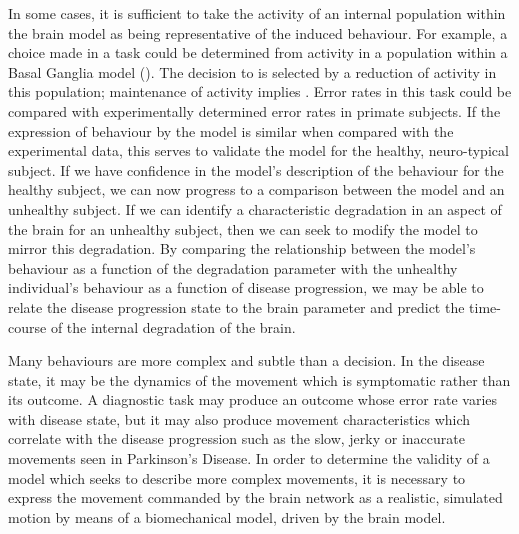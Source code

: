 \documentclass{frontiersSCNS}
\begin{document}
In some cases, it is sufficient to take the activity of an internal
population within the brain model as being representative of the
induced behaviour. For example, a choice made in a  task
could be determined from activity in a population within a Basal
Ganglia model
(). The decision
to  is selected by a reduction of activity in this population;
maintenance of activity implies . Error rates in this task
could be compared with experimentally determined error rates in
primate subjects.
If the expression of behaviour by the model is similar when compared
with the experimental data, this serves to validate the model for the
healthy, neuro-typical subject.
If we have confidence in the model's description of the behaviour for
the healthy subject, we can now progress to a comparison between the
model and an unhealthy subject. If we can identify a characteristic
degradation in an aspect of the brain for an unhealthy subject, then
we can seek to modify the model to mirror this degradation. By
comparing the relationship between the model's behaviour as a function
of the degradation parameter with the unhealthy individual's behaviour
as a function of disease progression, we may be able to relate the
disease progression state to the brain parameter and predict the
time-course of the internal degradation of the brain.

Many behaviours are more complex and subtle than a decision. In the
disease state, it may be the dynamics of the movement which is
symptomatic rather than its outcome. A diagnostic task may produce an
outcome whose error rate varies with disease state, but it may also
produce movement characteristics which correlate with the disease
progression such as the slow, jerky or inaccurate movements seen in
Parkinson's Disease. In order to determine the validity of a model
which seeks to describe more complex movements, it is necessary to
express the movement commanded by the brain network as a realistic,
simulated motion by means of a biomechanical model, driven by the
brain model.
\end{document}
